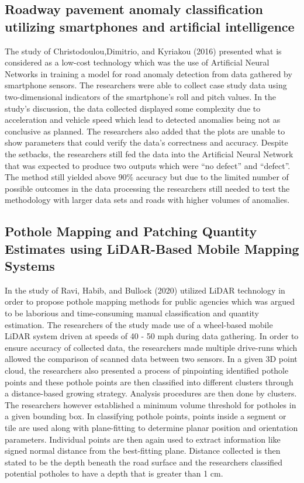 \documentclass{report} %
\begin{document}
	\subsection{Roadway pavement anomaly classification utilizing smartphones and artificial intelligence}
		The study of Christodoulou,Dimitrio, and Kyriakou (2016) presented what is considered as a low-cost technology which was the use of Artificial Neural Networks in training a model for road anomaly detection from data gathered by smartphone sensors. The researchers were able to collect case study data using two-dimensional indicators of the smartphone’s roll and pitch values. In the study’s discussion, the data collected displayed some complexity due to acceleration and vehicle speed which lead to detected anomalies being not as conclusive as planned. The researchers also added that the plots are unable to show parameters that could verify the data’s correctness and accuracy. Despite the setbacks, the researchers still fed the data into the Artificial Neural Network that was expected to produce two outputs which were “no defect” and “defect”. The method still yielded above 90\% accuracy but due to the limited number of possible outcomes in the data processing the researchers still needed to test the methodology with larger data sets and roads with higher volumes of anomalies.
		
	\subsection{Pothole Mapping and Patching Quantity Estimates using LiDAR-Based Mobile Mapping Systems}
		In the study of Ravi, Habib, and Bullock (2020) utilized LiDAR technology in order to propose pothole mapping methods for public agencies which was argued to be laborious and time-consuming manual classification and quantity estimation. The researchers of the study made use of a wheel-based mobile LiDAR system driven at speeds of 40 - 50 mph during data gathering. In order to ensure accuracy of collected data, the researchers made multiple drive-runs which allowed the comparison of scanned data between two sensors. In a given 3D point cloud,  the researchers also presented a process of pinpointing identified pothole points and these pothole points are then classified into different clusters through a distance-based growing strategy. Analysis procedures are then done by clusters. The researchers however established a minimum volume threshold for potholes in a given bounding box. In classifying pothole points, points inside a segment or tile are used along with plane-fitting to determine planar position and orientation parameters. Individual points are then again used to extract information like signed normal distance from the best-fitting plane. Distance collected is then stated to be the depth beneath the road surface and the researchers classified potential potholes to have a depth that is greater than 1 cm.
		
		
	
	
\end{document}
